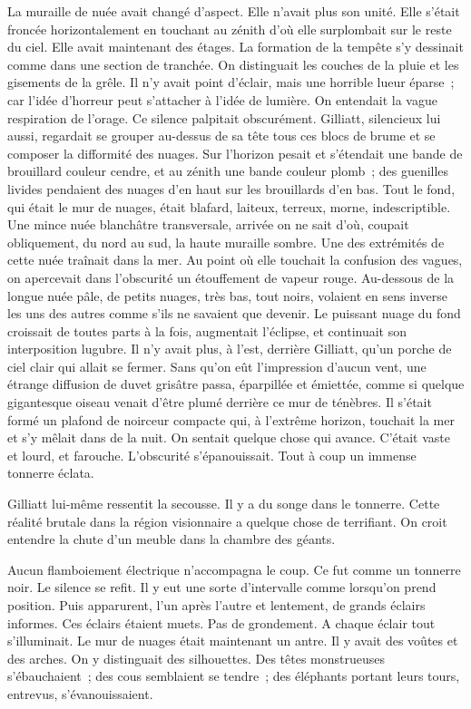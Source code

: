 \documentclass[french,twoside]{book} %
\begin{document}
La muraille de nuée avait changé d’aspect. Elle n’avait plus son unité. Elle s’était froncée horizontalement en touchant au zénith d’où elle surplombait sur le reste du ciel. Elle avait maintenant des étages. La formation de la tempête s’y dessinait comme dans une section de tranchée. On distinguait les couches de la pluie et les gisements de la grêle. Il n’y avait point d’éclair, mais une horrible lueur éparse ; car l’idée  d’horreur peut s’attacher à l’idée de lumière. On entendait la vague respiration de l’orage. Ce silence palpitait obscurément. Gilliatt, silencieux lui aussi, regardait se grouper au-dessus de sa tête tous ces blocs de brume et se composer la difformité des nuages. Sur l’horizon pesait et s’étendait une bande de brouillard couleur cendre, et au zénith une bande couleur plomb ; des guenilles livides pendaient des nuages d’en haut sur les brouillards d’en bas. Tout le fond, qui était le mur de nuages, était blafard, laiteux, terreux, morne, indescriptible. Une mince nuée blanchâtre transversale, arrivée on ne sait d’où, coupait obliquement, du nord au sud, la haute muraille sombre. Une des extrémités de cette nuée traînait dans la mer. Au point où elle touchait la confusion des vagues, on apercevait dans l’obscurité un étouffement de vapeur rouge. Au-dessous de la longue nuée pâle, de petits nuages, très bas, tout noirs, volaient en sens inverse les uns des autres comme s’ils ne savaient que devenir. Le puissant nuage du fond croissait de toutes parts à la fois, augmentait l’éclipse, et continuait son interposition lugubre. Il n’y avait plus, à l’est, derrière Gilliatt, qu’un porche de ciel clair qui allait se fermer. Sans qu’on eût l’impression d’aucun vent, une étrange diffusion de duvet grisâtre passa, éparpillée et émiettée, comme si quelque gigantesque oiseau venait d’être plumé derrière ce mur de ténèbres. Il s’était formé un plafond de noirceur compacte qui, à l’extrême horizon, touchait la mer et s’y mêlait dans de la nuit. On sentait quelque chose qui avance. C’était vaste et  lourd, et farouche. L’obscurité s’épanouissait. Tout à coup un immense tonnerre éclata.\par
Gilliatt lui-même ressentit la secousse. Il y a du songe dans le tonnerre. Cette réalité brutale dans la région visionnaire a quelque chose de terrifiant. On croit entendre la chute d’un meuble dans la chambre des géants.\par
Aucun flamboiement électrique n’accompagna le coup. Ce fut comme un tonnerre noir. Le silence se refit. Il y eut une sorte d’intervalle comme lorsqu’on prend position. Puis apparurent, l’un après l’autre et lentement, de grands éclairs informes. Ces éclairs étaient muets. Pas de grondement. A chaque éclair tout s’illuminait. Le mur de nuages était maintenant un antre. Il y avait des voûtes et des arches. On y distinguait des silhouettes. Des têtes monstrueuses s’ébauchaient ; des cous semblaient se tendre ; des éléphants portant leurs tours, entrevus, s’évanouissaient.\par
\end{document}
